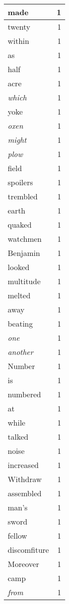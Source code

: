 \begin{center}
\begin{longtable}{l|r}
made & 1 \\ \hline
twenty & 1 \\ \hline
within & 1 \\ \hline
as & 1 \\ \hline
half & 1 \\ \hline
acre & 1 \\ \hline
\emph{which} & 1 \\ \hline
yoke & 1 \\ \hline
\emph{oxen} & 1 \\ \hline
\emph{might} & 1 \\ \hline
\emph{plow} & 1 \\ \hline
field & 1 \\ \hline
spoilers & 1 \\ \hline
trembled & 1 \\ \hline
earth & 1 \\ \hline
quaked & 1 \\ \hline
watchmen & 1 \\ \hline
Benjamin & 1 \\ \hline
looked & 1 \\ \hline
multitude & 1 \\ \hline
melted & 1 \\ \hline
away & 1 \\ \hline
beating & 1 \\ \hline
\emph{one} & 1 \\ \hline
\emph{another} & 1 \\ \hline
Number & 1 \\ \hline
is & 1 \\ \hline
numbered & 1 \\ \hline
at & 1 \\ \hline
while & 1 \\ \hline
talked & 1 \\ \hline
noise & 1 \\ \hline
increased & 1 \\ \hline
Withdraw & 1 \\ \hline
assembled & 1 \\ \hline
man's & 1 \\ \hline
sword & 1 \\ \hline
fellow & 1 \\ \hline
discomfiture & 1 \\ \hline
Moreover & 1 \\ \hline
camp & 1 \\ \hline
\emph{from} & 1 \\ \hline

\end{longtable}
\end{center}
